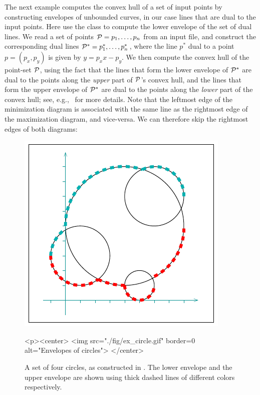
The next example computes the convex hull of a set of input points
by constructing envelopes of unbounded curves, in our case lines
that are dual to the input points. Here use the
 class to compute the lower envelope of the
set of dual lines. We read a set of points ${\cal P} = p_1, \ldots, p_n$
from an input file, and construct the corresponding dual lines
${\cal P}^{*} = p^{*}_1, \ldots, p^{*}_n$, where the line $p^{*}$ dual
to a point $p = (p_x, p_y)$ is given by $y = p_x x - p_y$. We then
compute the convex hull of the point-set ${\cal P}$, using the fact that
the lines that form the lower envelope of ${\cal P}^{*}$ are dual to the
points along the {\em upper} part of ${\cal P}$'s convex hull, and the
lines that form the upper envelope of ${\cal P}^{*}$ are dual to the
points along the {\em lower} part of the convex hull; see,
e.g.,~\cite[Section~11.4]{bkos-cgaa-00} for more details.
Note that the leftmost edge of the minimization diagram is associated
with the same line as the rightmost edge of the maximization diagram,
and vice-versa. We can therefore skip the rightmost edges of both
diagrams:


\begin{figure}[t]
\begin{ccTexOnly}
  \begin{center}
    \includegraphics{Envelope_2/fig/ex_circle}
  \end{center}
\end{ccTexOnly}
\begin{ccHtmlOnly}
  <p><center>
  <img src="./fig/ex_circle.gif" border=0 alt="Envelopes of circles">
  </center>
\end{ccHtmlOnly}
\caption{A set of four circles, as constructed in
. The lower envelope and the upper
envelope are shown using thick dashed lines of different colors
respectively.\label{env2_fig:ex_circ}}
\end{figure}

